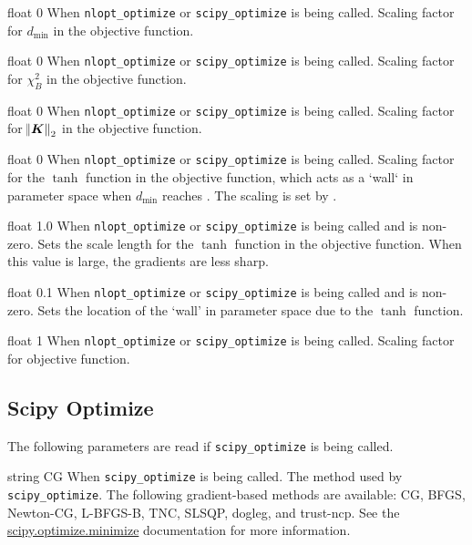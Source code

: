 \myhrule

{float}
{0}
{When \texttt{nlopt\_optimize} or \texttt{scipy\_optimize} is being called.}
{Scaling factor for $d_{\text{min}}$ in the objective function.}

\myhrule

{float}
{0}
{When \texttt{nlopt\_optimize} or \texttt{scipy\_optimize} is being called.}
{Scaling factor for $\chi^2_B$ in the objective function.}

\myhrule

{float}
{0}
{When \texttt{nlopt\_optimize} or \texttt{scipy\_optimize} is being called.}
{Scaling factor for $\norm{\bm{K}}_2$ in the objective function.}

\myhrule

{float}
{0}
{When \texttt{nlopt\_optimize} or \texttt{scipy\_optimize} is being called.}
{Scaling factor for the $\tanh$ function in the objective function, which acts as a `wall` in parameter space when $d_{\min}$ reaches . The scaling is set by .}

\myhrule

{float}
{1.0}
{When \texttt{nlopt\_optimize} or \texttt{scipy\_optimize} is being called and  is non-zero.}
{Sets the scale length for the $\tanh$ function in the objective function. When this value is large, the gradients are less sharp.}

\myhrule

{float}
{0.1}
{When \texttt{nlopt\_optimize} or \texttt{scipy\_optimize} is being called and  is non-zero.}
{Sets the location of the `wall' in parameter space due to the $\tanh$ function.}

\myhrule

{float}
{1}
{When \texttt{nlopt\_optimize} or \texttt{scipy\_optimize} is being called.}
{Scaling factor for objective function.}

\myhrule

\subsection{Scipy Optimize}

The following parameters are read if \texttt{scipy\_optimize} is being called. 

{string}
{CG}
{When \texttt{scipy\_optimize} is being called.}
{The method used by \texttt{scipy\_optimize}. The following gradient-based methods are available: CG, BFGS, Newton-CG, L-BFGS-B, TNC, SLSQP, dogleg, and trust-ncp. See the \\
\href{https://docs.scipy.org/doc/scipy/reference/generated/scipy.optimize.minimize.html}{scipy.optimize.minimize} documentation for more information.}

